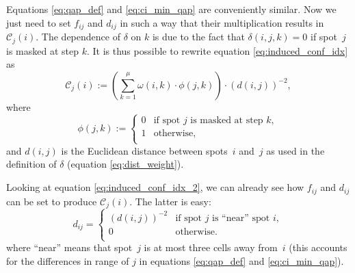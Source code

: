 \documentclass{bioinfo}
\begin{document}
Equations \ref{eq:qap_def} and \ref{eq:ci_min_qap} are conveniently similar. Now we just need to set $f_{ij}$ and $d_{ij}$ in such a way that their multiplication results in $\mathcal{C}_{j}(i)$. The dependence of $\delta$ on $k$ is due to the fact that $\delta(i,j,k) = 0$ if spot~$j$ is masked at step $k$. It is thus possible to rewrite equation \ref{eq:induced_conf_idx} as
\begin{equation}
\label{eq:induced_conf_idx_2}
\mathcal{C}_{j}(i) := \left( \sum_{k=1}^{\mu} \omega(i,k) \cdot \phi(j,k) \right) \cdot (d(i,j))^{-2},
\end{equation}
where
\begin{equation}
\phi(j,k) :=
        \left\{
                \begin{array}{ll}
                        0 & \mbox{if spot $j$ is masked at step $k$}, \\
                        1 & \mbox{otherwise}, \\
                \end{array}
        \right.
\end{equation}
and $d(i,j)$ is the Euclidean distance between spots~$i$ and~$j$ as used in the definition of $\delta$ (equation \ref{eq:dist_weight}).

Looking at equation \ref{eq:induced_conf_idx_2}, we can already see how $f_{ij}$ and $d_{ij}$ can be set to produce $\mathcal{C}_j(i)$. The latter is easy:
\begin{equation}
d_{ij} =
	\left\{
                \begin{array}{ll}
                        (d(i,j))^{-2} & \mbox{if spot $j$ is ``near'' spot $i$}, \\
                        0 & \mbox{otherwise}. \\
                \end{array}
	\right.
\end{equation}
where ``near'' means that spot~$j$ is at most three cells away from~$i$ (this accounts for the differences in range of $j$ in equations \ref{eq:qap_def} and \ref{eq:ci_min_qap}).
\end{document}
